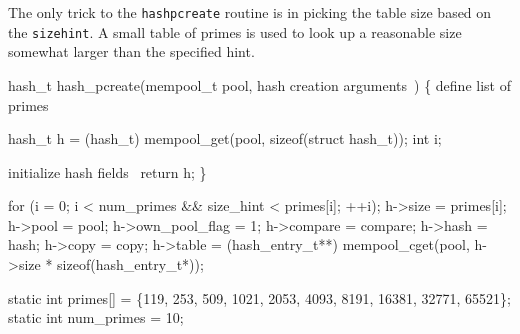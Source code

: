 \nwendcode{}\nwdocspar

The only trick to the {\tt{}hash{}pcreate} routine is in picking the
table size based on the {\tt{}size{}hint}.  A small table of primes
is used to look up a reasonable size somewhat larger than the
specified hint.

\nwenddocs{}\plusendmoddef
hash_t hash_pcreate(mempool_t pool,
                    \LA{}hash creation arguments~{\nwtagstyle{}}\RA{})
\{
    \LA{}define list of primes~{\nwtagstyle{}}\RA{}

    hash_t h = (hash_t) mempool_get(pool, sizeof(struct hash_t));
    int i;

    \LA{}initialize hash fields~{\nwtagstyle{}}\RA{}
    return h;
\}

\nwendcode{}\nwdocspar

\nwenddocs{}\endmoddef
for (i = 0; i < num_primes && size_hint < primes[i]; ++i);
h->size          = primes[i];
h->pool          = pool;
h->own_pool_flag = 1;
h->compare  = compare;
h->hash     = hash;
h->copy     = copy;
h->table    = (hash_entry_t**) 
              mempool_cget(pool, h->size * sizeof(hash_entry_t*));
\nwendcode{}\nwdocspar

\nwenddocs{}\endmoddef
static int primes[] = \{119,  253,  509,   1021,  2053, 
                       4093, 8191, 16381, 32771, 65521\};
static int num_primes = 10;
\nwendcode{}\nwdocspar

